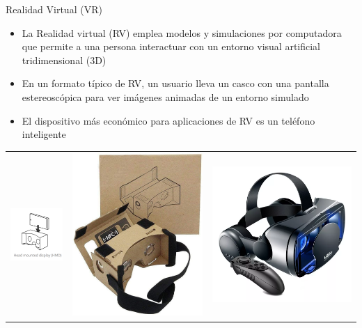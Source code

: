 \begin{frame}{Realidad Virtual (VR)}
		\begin{itemize}
			\item La Realidad virtual (RV) emplea modelos y simulaciones por computadora que permite a una persona interactuar con un entorno visual artificial tridimensional (3D)
			\item En un formato típico de RV, un usuario lleva un casco con una pantalla estereoscópica para ver imágenes animadas de un entorno simulado
			\item El dispositivo m\'as econ\'omico para aplicaciones de RV es un tel\'efono inteligente 
		\end{itemize}
    \begin{center}
	\begin{tabular}{ccc}
    	\centering
		\includegraphics[width=0.25\linewidth]{Figs/MobileVR2} & 
        \includegraphics[width=0.19\linewidth]{Figs/CardBoard} & 		
        \includegraphics[width=0.19\linewidth]{Figs/VRGPro} 		
	\end{tabular}
		 \end{center}
\end{frame}


